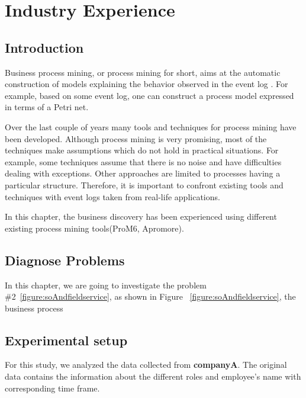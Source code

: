 \chapter{Industry Experience}
\label{chap:industryExperience}

\section{Introduction}
\label{sec:industryExperience-Introduction}

Business process mining, or process mining for short, aims at the automatic construction of models explaining the behavior observed in the event log \cite{maita2015process}. For example, based on some event log, one can construct a process model expressed in terms of a Petri net.

Over the last couple of years many tools and techniques for process mining have been developed\cite{rozinat2006decision}. Although process mining is very promising, most of the techniques make assumptions which do not hold in practical situations. For example, some techniques assume that there is no noise and have difficulties dealing with exceptions. Other approaches are limited to processes having a particular structure. Therefore, it is important to confront existing tools and techniques with event logs taken from real-life applications.

In this chapter, the business discovery has been experienced using different existing process mining tools(ProM6, Apromore).

\section{Diagnose Problems}

In this chapter, we are going to investigate the problem \#2~\ref{figure:soAndfieldservice}, as shown in Figure ~\ref{figure:soAndfieldservice}, the business process 

\section{Experimental setup}
\label{sec:industryExperience-Methodology}
For this study, we analyzed the data collected from  \textbf{companyA}. 
The original data contains the information about the different roles and employee's name with corresponding time frame.


